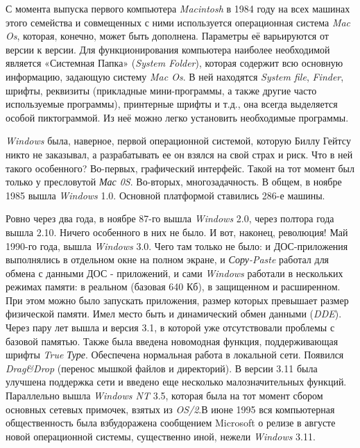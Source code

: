 С момента выпуска первого компьютера \textit{Macintosh} в 1984 году на всех машинах этого семейства и совмещенных с ними используется операционная система \textit{Mac Os}, которая, конечно, может быть дополнена. Параметры её варьируются от версии к версии. Для функционирования компьютера наиболее необходимой является «Системная Папка» (\textit{System Folder}), которая содержит всю основную информацию, задающую систему \textit{Mac Os}. В ней находятся \textit{System file}, \textit{Finder}, шрифты, реквизиты (прикладные мини-программы, а также другие часто используемые программы), принтерные шрифты и т.д., она всегда выделяется особой пиктограммой. Из неё можно легко установить необходимые программы.



\textit{Windows} была, наверное, первой операционной системой, которую Биллу Гейтсу никто не заказывал, а разрабатывать ее он взялся на свой страх и риск. Что в ней такого особенного? Во-первых, графический интерфейс. Такой на тот момент был только у пресловутой \textit{Мас 0S}. Во-вторых, многозадачность. В общем, в ноябре 1985 вышла \textit{Windows} 1.0. Основной платформой ставились 286-е машины.

Ровно через два года, в ноябре 87-го вышла \textit{Windows} 2.0, через полтора года вышла 2.10. Ничего особенного в них не было. И вот, наконец, революция! Май 1990-го года, вышла \textit{Windows} 3.0. Чего там только не было: и ДОС-приложения выполнялись в отдельном окне на полном экране, и \textit{Сору-Paste} работал для обмена с данными ДОС - приложений, и сами \textit{Windows} работали в нескольких режимах памяти: в реальном (базовая 640 Кб), в защищенном и расширенном. При этом можно было запускать приложения, размер которых превышает размер физической памяти. Имел место быть и динамический обмен данными (\textit{DDE}). Через пару лет вышла и версия 3.1, в которой уже отсутствовали проблемы с базовой памятью. Также была введена новомодная функция, поддерживающая шрифты \textit{True Туре}. Обеспечена нормальная работа в локальной сети. Появился \textit{Drag\&Drop} (перенос мышкой файлов и директорий). В версии 3.11 была улучшена поддержка сети и введено еще несколько малозначительных функций. Параллельно вышла \textit{Windows NT} 3.5, которая была на тот момент сбором основных сетевых примочек, взятых из \textit{OS/2}.В июне 1995 вся компьютерная общественность была взбудоражена сообщением Microsoft о релизе в августе новой операционной системы, существенно иной, нежели \textit{Windows} 3.11.

